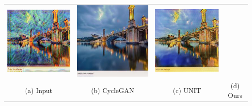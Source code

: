 \documentclass[landscape,a0paper,fontscale=0.285]{baposter} %
\begin{document}
\begin{poster}
{\begin{minipage}{1\linewidth}
\begin{tabular}{cccc}
  \includegraphics[width=.24\textwidth]{figures/vangoh/cycle.jpg}&
  \includegraphics[width=.24\textwidth]{figures/UNIT/vangoh.jpg}&
  \includegraphics[width=.24\textwidth]{figures/vangoh/ours.jpg} \\
   (a) Input & (b) CycleGAN  & (c) {UNIT} & (d) Ours  \\
\end{tabular}
\end{minipage}
}


\end{poster}
\end{document}
